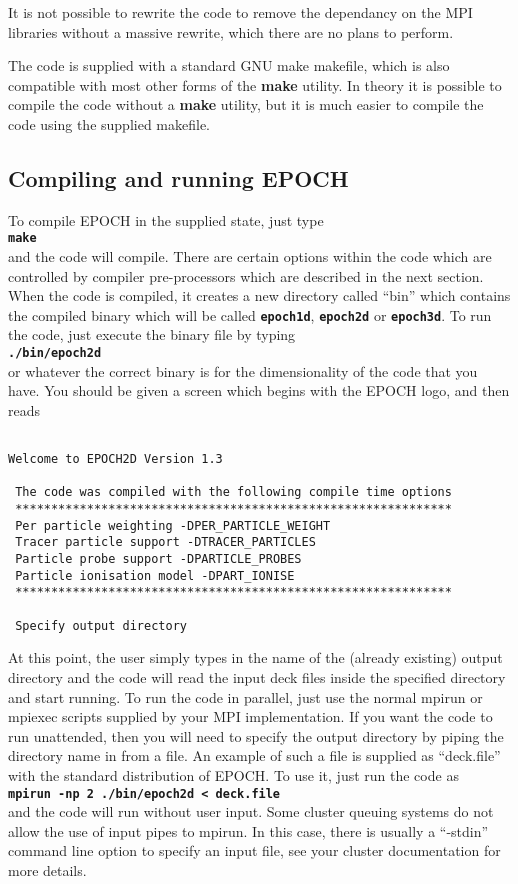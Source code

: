 \documentclass[12pt]{article}
\newcommand{\simpleboxverbatim}{\begin{Verbatim}[obeytabs=true,frame=single,
  framerule=0.5mm,rulecolor=\color{warwickmid}]}
\newcommand{\inlinecode}[1]{{\color{warwickred} \bf\texttt{#1}}}
\newcommand{\nEPOCH}{{\color{warwickdark}\fontfamily{phv}\selectfont EPOCH}}
\newcommand{\EPOCH}{{\nEPOCH} }
\begin{document}
It is not possible to rewrite the code to remove the dependancy on the MPI
libraries without a massive rewrite, which there are no plans to perform.

The code is supplied with a standard GNU make makefile, which is also
compatible with most other forms of the {\bf make} utility. In theory it is
possible to compile the code without a {\bf make} utility, but it is much
easier to compile the code using the supplied makefile.

\subsection{Compiling and running \EPOCH}

To compile \EPOCH in the supplied state, just type\\
\inlinecode{make}\\
and the code will compile. There are certain options within the code which are
controlled by compiler pre-processors which are described in the next
section. When the code is compiled, it creates a new directory called ``bin''
which contains the compiled binary which will be called \inlinecode{epoch1d},
\inlinecode{epoch2d} or \inlinecode{epoch3d}. To run the code, just execute the
binary file by typing\\
\inlinecode{./bin/epoch2d}\\
or whatever the correct binary is for the dimensionality of the code that you
have. You should be given a screen which begins with the \EPOCH logo, and then
reads\\

\simpleboxverbatim

Welcome to EPOCH2D Version 1.3

 The code was compiled with the following compile time options
 *************************************************************
 Per particle weighting -DPER_PARTICLE_WEIGHT
 Tracer particle support -DTRACER_PARTICLES
 Particle probe support -DPARTICLE_PROBES
 Particle ionisation model -DPART_IONISE
 *************************************************************

 Specify output directory

\end{Verbatim}

At this point, the user simply types in the name of the (already existing)
output directory and the code will read the input deck files inside the
specified directory and start running. To run the code in parallel, just use
the normal mpirun or mpiexec scripts supplied by your MPI implementation. If
you want the code to run unattended, then you will need to specify the output
directory by piping the directory name in from a file. An example of such a
file is supplied as ``deck.file'' with the standard distribution of \nEPOCH. To
use it, just run the code as\\
\inlinecode{mpirun -np 2 ./bin/epoch2d < deck.file}\\
and the code will run without user input. Some cluster queuing systems do not
allow the use of input pipes to mpirun. In this case, there is usually a
``-stdin'' command line option to specify an input file, see your cluster
documentation for more details.
\end{document}
